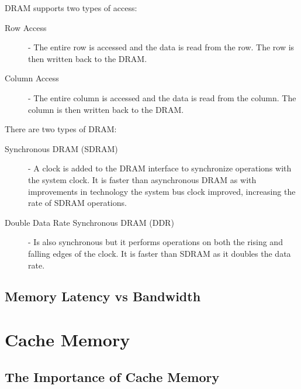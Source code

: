 \documentclass[12pt letter]{report}
\begin{document}
DRAM supports two types of access:
\begin{description}
  \item[Row Access]  - The entire row is accessed and the data is read from the row. The row is then written back to the DRAM.
  \item[Column Access] - The entire column is accessed and the data is read from the column. The column is then written back to the DRAM.
\end{description}

There are two types of DRAM:
\begin{description}
  \item[Synchronous DRAM (SDRAM)] - A clock is added to the DRAM interface to synchronize operations with the system clock. It is faster than asynchronous DRAM as with improvements in technology the system bus clock improved, increasing the rate of SDRAM operations.
  \item[Double Data Rate Synchronous DRAM (DDR)] - Is also synchronous but it performs operations on both the rising and falling edges of the clock. It is faster than SDRAM as it doubles the data rate.
\end{description}

\section{Memory Latency vs Bandwidth}



\chapter{Cache Memory}

\section{The Importance of Cache Memory}
\end{document}
